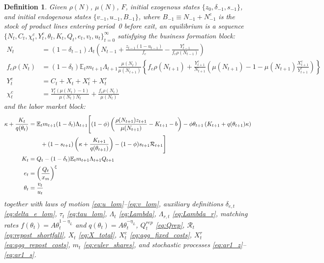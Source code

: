 \documentclass[authoryear, review, 12pt]{elsarticle}
\newtheorem{definition}{Definition}
\begin{document}
	\begin{definition}\label{def:equilibrium}
		Given $\rho(N)$, $\mu(N)$, $F$, initial exogenous
		states $\{z_0,\delta_{-1},s_{-1}\}$, and initial endogenous
		states $\{v_{-1},u_{-1},B_{-1}\}$, where
		$B_{-1}\equiv N_{-1}+N^e_{-1}$ is the stock of product lines
		entering period~0 before exit, an equilibrium is
		a sequence $\{N_t, C_t, \chi_t^c, Y_t^c, \theta_t,
		K_t, Q_t, e_t, v_t, u_t\}_{t=0}^\infty$ satisfying the
		business formation block:
		\begin{align}
			\label{eq:N_lom_eq}
			N_t &= (1-\delta_{t-1})\Lambda_t
			\left(N_{t-1} + \frac{z_{t-1}(1-u_{t-1})}{f_e}
			- \frac{Y_{t-1}^c}{f_e\rho(N_{t-1})}\right) \\
			\label{eq:N_euler_eq}
			f_e\rho(N_t) &= (1-\delta_t)\mathbb{E}_t 
			m_{t+1}\Lambda_{t+1}
			\frac{\mu(N_t)}{\mu(N_{t+1})}
			\left\{f_e\rho(N_{t+1}) + \frac{Y_{t+1}^c}{N_{t+1}}
			\left(\mu(N_{t+1})-1-\mu(N_{t+1})
			\frac{X_{t+1}^c}{Y_{t+1}^c}\right)\right\} \\
			\label{eq:rc}
			Y_t^c &= C_t + X_t + X_t^c+X_t^r \\
			\label{eq:cutoff_eq}
			\chi_t^c &= \frac{Y_t^c(\mu(N_t)-1)}{\mu(N_t)N_t} 
			+ \frac{f_e\rho(N_t)}{\mu(N_t)}
		\end{align}
		and the labor market block:
		\begin{align}
			\label{eq:jcc_eq}
			\kappa+\frac{K_t}{q(\theta_t)} &=
			\mathbb{E}_t m_{t+1}(1-\delta_t)\Lambda_{t+1}
			\Biggl[(1-\phi)\left(\frac{\rho(N_{t+1})z_{t+1}}
			{\mu(N_{t+1})}-K_{t+1}-b\right)
			-\phi\theta_{t+1}\left(K_{t+1}+q(\theta_{t+1})\kappa\right)
			\notag \\
			&\qquad +(1-s_{t+1})\left(\kappa
			+\frac{K_{t+1}}{q(\theta_{t+1})}\right)
			-(1-\phi)s_{t+1}\mathcal{R}_{t+1}\Biggr] \\
			\label{eq:Kdef}
			K_t &= Q_t - (1-\delta_t)\mathbb{E}_t 
			m_{t+1}\Lambda_{t+1}Q_{t+1} \\
			\label{eq:entry_eq}
			e_t &= \left(\frac{Q_t}{x_m}\right)^\xi \\
			\label{eq:theta_eq}
			\theta_t &= \frac{v_t}{u_t}
		\end{align}
		together with laws of motion
		\eqref{eq:u_lom}--\eqref{eq:v_lom}, auxiliary
		definitions $\delta_{e,t}$ \eqref{eq:delta_e_lom},
		$\tau_t$ \eqref{eq:tau_lom}, $\Lambda_t$
		\eqref{eq:Lambda}, $\Lambda_{r,t}$ \eqref{eq:Lambda_r},
		matching rates $f(\theta_t)=A\theta_t^{1-\eta_L}$ and
		$q(\theta_t)=A\theta_t^{-\eta_L}$,
		$Q_t^{rep}$ \eqref{eq:Qrep},
		$\mathcal{R}_t$ \eqref{eq:repost_shortfall},
		$X_t$ \eqref{eq:X_total}, $X_t^c$
		\eqref{eq:agg_fixed_costs}, $X_t^r$
		\eqref{eq:agg_repost_costs}, $m_t$
		\eqref{eq:euler_shares}, and
		stochastic processes \eqref{eq:ar1_z}--\eqref{eq:ar1_s}.
	\end{definition}
	
\end{document}
